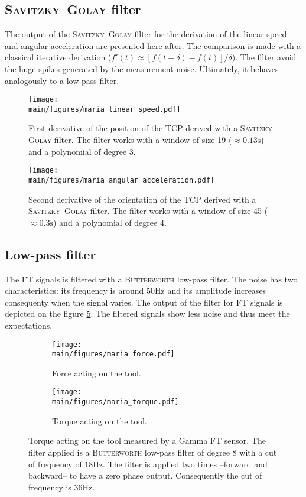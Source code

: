 \documentclass[/home/francois/latex/report/main.tex]{subfiles}
\begin{document}
\subsection{\textsc{Savitzky–Golay} filter}

The output of the \textsc{Savitzky–Golay} filter for the derivation of the linear speed and angular acceleration are presented here after. The comparison is made with a classical iterative derivation ($f'(t) \approx  [f(t+\delta) - f(t)] / \delta$). The filter avoid the huge spikes generated by the measurement noise. Ultimately, it behaves analogously to a low-pass filter.


\begin{figure}[h]
  \centering
  \texttt{[image: \\main/figures/maria\_linear\_speed.pdf]}
  \caption{First derivative of the position of the \ac{TCP} derived with a \textsc{Savitzky–Golay} filter. The filter works with a window of size 19 ($\approx 0.13 \si{\second}$) and a polynomial of degree 3.}
  \label{fig:results:linear-speed-filtered}
\end{figure}

\begin{figure}[h]
  \centering
  \texttt{[image: \\main/figures/maria\_angular\_acceleration.pdf]}
  \caption{Second derivative of the orientation of the \ac{TCP} derived with a \textsc{Savitzky–Golay} filter. The filter works with a window of size 45 ($\approx 0.3 \si{\second}$) and a polynomial of degree 4.}
  \label{fig:results:angular-acceleration-filtered}
\end{figure}

\subsection{Low-pass filter}

The \ac{FT} signals is filtered with a \textsc{Butterworth} low-pass filter. The noise has two characteristics: its frequency is around $50 \si{\hertz}$ and its amplitude increases consequenty when the signal varies. The output of the filter for \ac{FT} signals is depicted on the figure \ref{fig:results:force-torque}. The filtered signals show less noise and thus meet the expectations.

\begin{figure}[h]
\centering
\begin{subfigure}{0.6\textwidth}
\centering
\texttt{[image: \\main/figures/maria\_force.pdf]}
\caption{Force acting on the tool.}
\label{fig:results:force}
\end{subfigure}
\begin{subfigure}{0.6\textwidth}
\centering
\texttt{[image: \\main/figures/maria\_torque.pdf]}
\caption{Torque acting on the tool.}
\label{fig:results:torque}
\end{subfigure}
\caption{Torque acting on the tool measured by a Gamma \ac{FT} sensor. The  filter applied is a \textsc{Butterworth} low-pass filter of degree 8 with a cut of frequency of $18 \si{\hertz}$. The filter is applied two times –forward and backward– to have a zero phase output. Consequently the cut of frequency is $36 \si{\hertz}$. \label{fig:results:force-torque}}
\end{figure}
\end{document}
